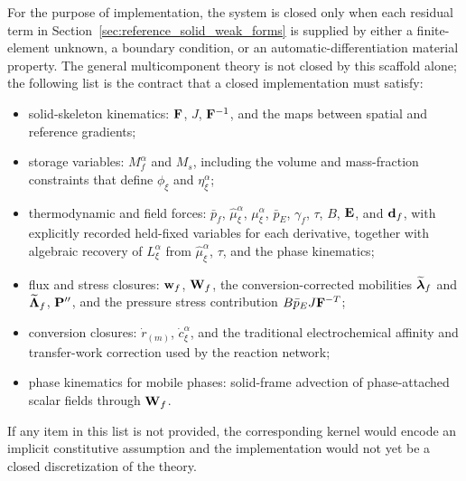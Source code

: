 For the purpose of implementation, the system is closed only when each residual
term in Section~\ref{sec:reference_solid_weak_forms} is supplied by either a
finite-element unknown, a boundary condition, or an automatic-differentiation
material property.  The general multicomponent theory is not closed by this
scaffold alone; the following list is the contract that a closed implementation
must satisfy:
\begin{itemize}[leftmargin=*]
	\item solid-skeleton kinematics: \(\mathbf{F}\), \(J\), \(\mathbf{F}^{-1}\), and
	the maps between spatial and reference gradients;
	\item storage variables: \(M_f^\alpha\) and \(M_s\), including the volume
	and mass-fraction constraints that define \(\phi_\xi\) and
	\(\eta_\xi^\alpha\);
	\item thermodynamic and field forces: \(\bar p_f\),
	\(\hat\mu_\xi^\alpha\), \(\mu_\xi^\alpha\), \(\bar p_E\), \(\gamma_f\),
	\(\tau\), \(B\),
	\(\mathbf{E}\), and \(\mathbf{d}_f\), with explicitly recorded held-fixed
	variables for each derivative, together with algebraic recovery of
	\(L_\xi^\alpha\) from \(\hat\mu_\xi^\alpha\), \(\tau\), and the phase
	kinematics;
	\item flux and stress closures: \(\mathbf{w}_f\), \(\mathbf{W}_f\),
	the conversion-corrected mobilities
	\(\widetilde{\boldsymbol{\lambda}}_f\) and \(\widetilde{\boldsymbol{\Lambda}}_f\),
	\(\mathbf{P}^{\prime\prime}\), and the pressure stress contribution
	\(B\bar p_EJ\mathbf{F}^{-T}\);
	\item conversion closures: \(\dot r_{(m)}\), \(\dot c_\xi^\alpha\), and
	the traditional electrochemical affinity and transfer-work correction used
	by the reaction network;
	\item phase kinematics for mobile phases: solid-frame advection of
	phase-attached scalar fields through \(\mathbf{W}_f\).
\end{itemize}
If any item in this list is not provided, the corresponding kernel would encode
an implicit constitutive assumption and the implementation would not yet be a
closed discretization of the theory.

